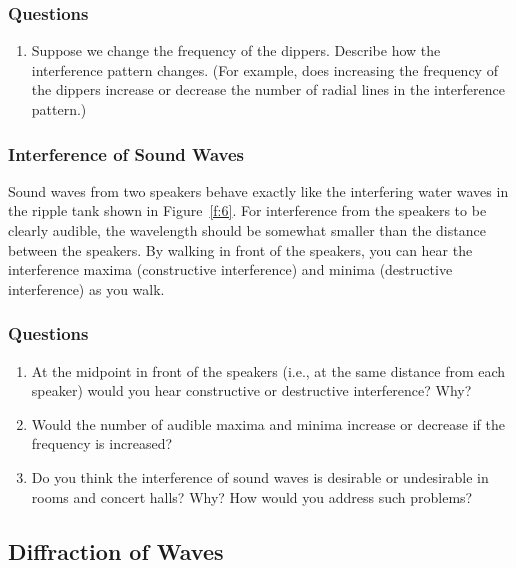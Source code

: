 \documentclass[11pt]{NSF}
\def\ben{\begin{enumerate}}
\def\een{\end{enumerate}}
\def\i{\item{}}
\begin{document}
\subsubsection*{Questions}

\ben
\i Suppose we change the frequency of the dippers.
Describe how the interference pattern changes.
(For example, does increasing the frequency of the 
dippers increase or decrease the number of radial 
lines in the interference pattern.)

\een

\subsubsection{Interference of Sound Waves}

Sound waves from two speakers behave exactly like the 
interfering water waves in the ripple tank shown
in Figure~\ref{f:6}.
For interference from the speakers to be clearly audible, 
the wavelength should be somewhat smaller than the distance between the speakers.
By walking in front of the speakers, you can hear the
interference maxima (constructive interference) and 
minima (destructive interference) as you walk.

\subsubsection*{Questions}

\ben
\i At the midpoint in front of the speakers (i.e., at the 
same distance from each speaker) would you hear 
constructive or destructive interference? Why?

\i Would the number of audible maxima and minima 
increase or decrease if the frequency is increased?

\i Do you think the interference of sound waves is desirable 
or undesirable in rooms and concert halls?  
Why? How would you address such problems?

\een

\subsection{Diffraction of Waves}
\end{document}
